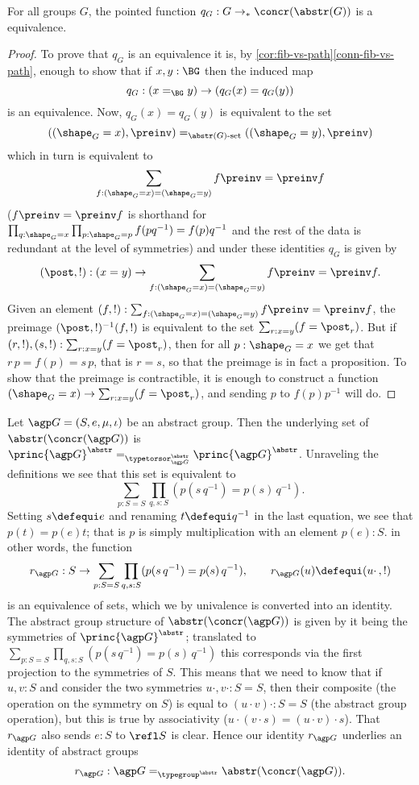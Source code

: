 \begin{lemma}
  \label{lem:Groupsareidentitytypes1}
For all groups $G$, the pointed function $q_G:G\to_*\concr(\abstr(G))$
is a  equivalence.
\end{lemma}
\begin{proof}
  To prove that $q_G$ is an equivalence it is, by \cref{cor:fib-vs-path}\ref{conn-fib-vs-path}, enough to show that if $x,y:\BG$ then the induced map
$$q_G:(x=_{\BG}y)\to (q_G(x)=q_G(y))
$$
is an equivalence.
  Now, $q_G(x)=q_G(y)$ is equivalent to the set
$$
((\shape_G=x),\preinv)=_{\abstr(G)\text{-set}}((\shape_G=y),\preinv)$$
which in turn is equivalent to
$$\sum_{f:(\shape_G=x)=(\shape_G=y)}f\preinv=\preinv f
$$
 ($f\preinv=\preinv f$ is shorthand for $\prod_{q:\shape_G=x}\prod_{p:\shape_G=p}f(pq^{-1})=f(p)q^{-1}$ and the rest of the data is redundant at the level of symmetries) and under these identities $q_G$ is given by
$$(\post,!):(x=y)\to \sum_{f:(\shape_G=x)=(\shape_G=y)}f\preinv=\preinv f.$$
Given an element
$(f,!):\sum_{f:(\shape_G=x)=(\shape_G=y)}f\preinv=\preinv f$, the preimage
$(\post,!)^{-1}(f,!)$ is equivalent to the set
$\sum_{r:x=y}(f=\post_r)$.  But if $(r,!),(s,!): \sum_{r:x=y}(f=\post_r)$, then for all $p:\shape_G=x$ we get that $r\,p=f(p)=s\,p$, that is $r=s$, so that the preimage is in fact a proposition.
To show that the preimage is contractible, it is enough to construct a function $(\shape_G=x)\to \sum_{r:x=y}(f=\post_r)$, and sending $p$ to $f(p)p^{-1}$ will do.
\end{proof}

\begin{example}
  \label{ex:abstrconcrG}
  Let ${\agp G}=(S,e,\mu,\iota)$ be an abstract group.
Then the underlying set of $\abstr(\concr({\agp G}))$ is $\princ {\agp G}^\abstr=_{\typetorsor^\abstr_{\agp G}}\princ {\agp G}^\abstr$.
Unraveling the definitions we see that this set is equivalent to
$$\sum_{p:S=S}\prod_{q,s:S}(p(s\,q^{-1})=p(s)\,q^{-1}).
$$
Setting $s\defequi e$ and renaming $t\defequi q^{-1}$ in the last equation, we see that $p(t)=p(e)t$; that is $p$ is simply multiplication with an element $p(e):S$.  in other words, the function
$$r_{\agp G}:S\to  \sum_{p:S=S}\prod_{q,s:S}(p(s\,q^{-1})=p(s)\,q^{-1}),\qquad r_{\agp G}(u)\defequi(u\cdot\,,!)
$$
is an equivalence of sets, which we by univalence is converted into an identity.
The abstract group structure of $\abstr(\concr({\agp G}))$ is given by it being the symmetries of $\princ {\agp G}^\abstr$; translated to $\sum_{p:S=S}\prod_{q,s:S}(p(s\,q^{-1})=p(s)\,q^{-1})$ this corresponds via the first projection to the symmetries of $S$.
This means that we need to know that if $u,v:S$ and consider the two symmetries $u\cdot,v\cdot:S=S$, then their composite (the operation on the symmetry on $S$) is equal to $(u\cdot v)\cdot:S=S$ (the abstract group operation), but this is true by associativity ($u\cdot(v\cdot s)=(u\cdot v)\cdot s$).  That $r_{\agp G}$ also sends $e:S$ to $\refl S$ is clear.
Hence our identity $r_{\agp G}$ underlies an identity of abstract groups
$$r_{\agp G}:{\agp G}=_{\typegroup^\abstr}\abstr(\concr({\agp G})).$$
\end{example}

